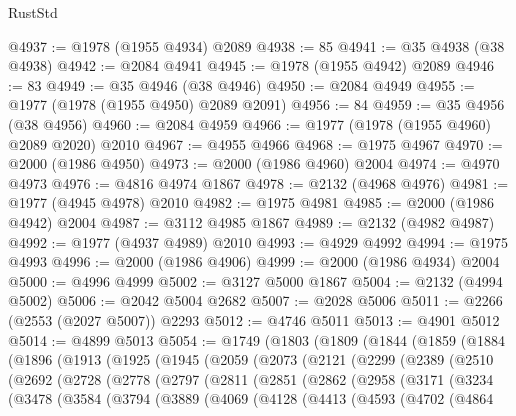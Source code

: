 \begin{lexlean}{RustStd}
\begin{coremodule}
{\begin{coremodule}
{{{{{{{{{{{{{{{{{{{{{{{{{{{{{{{@4937 := @1978 (@1955 @4934) @2089
@4938 := 85
@4941 := @35 @4938 (@38 @4938)
@4942 := @2084 @4941
@4945 := @1978 (@1955 @4942) @2089
@4946 := 83
@4949 := @35 @4946 (@38 @4946)
@4950 := @2084 @4949
@4955 := @1977 (@1978 (@1955 @4950) @2089 @2091)
@4956 := 84
@4959 := @35 @4956 (@38 @4956)
@4960 := @2084 @4959
@4966 := @1977 (@1978 (@1955 @4960) @2089 @2020) @2010
@4967 := @4955 @4966
@4968 := @1975 @4967
@4970 := @2000 (@1986 @4950)
@4973 := @2000 (@1986 @4960) @2004
@4974 := @4970 @4973
@4976 := @4816 @4974 @1867
@4978 := @2132 (@4968 @4976)
@4981 := @1977 (@4945 @4978) @2010
@4982 := @1975 @4981
@4985 := @2000 (@1986 @4942) @2004
@4987 := @3112 @4985 @1867
@4989 := @2132 (@4982 @4987)
@4992 := @1977 (@4937 @4989) @2010
@4993 := @4929 @4992
@4994 := @1975 @4993
@4996 := @2000 (@1986 @4906)
@4999 := @2000 (@1986 @4934) @2004
@5000 := @4996 @4999
@5002 := @3127 @5000 @1867
@5004 := @2132 (@4994 @5002)
@5006 := @2042 @5004 @2682
@5007 := @2028 @5006
@5011 := @2266 (@2553 (@2027 @5007)) @2293
@5012 := @4746 @5011
@5013 := @4901 @5012
@5014 := @4899 @5013
@5054 := @1749
    (@1803
      (@1809
        (@1844
          (@1859
            (@1884
              (@1896
                (@1913
                  (@1925
                    (@1945
                      (@2059
                        (@2073
                          (@2121
                            (@2299
                              (@2389
                                (@2510
                                  (@2692
                                    (@2728
                                      (@2778
                                        (@2797
                                          (@2811
                                            (@2851
                                              (@2862
                                                (@2958
                                                  (@3171
                                                    (@3234
                                                      (@3478
                                                        (@3584
                                                          (@3794
                                                            (@3889
                                                              (@4069
                                                                (@4128
                                                                  (@4413
                                                                    (@4593
                                                                      (@4702
                                                                        (@4864
}}}}}}}}}}}}}}}}}}}}}}}}}}}}}}}
\end{coremodule}}
\end{coremodule}
\end{lexlean}
